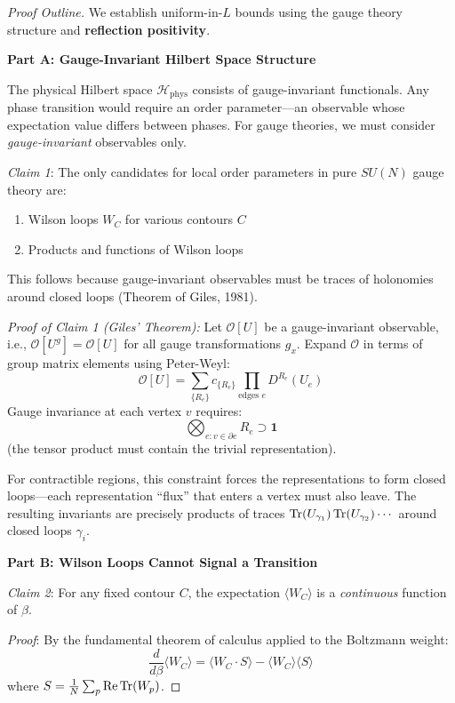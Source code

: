 \begin{proof}[Proof Outline]
We establish uniform-in-$L$ bounds using the gauge theory structure and 
\textbf{reflection positivity}.

\textbf{Part A: Gauge-Invariant Hilbert Space Structure}

The physical Hilbert space $\mathcal{H}_{\text{phys}}$ consists of gauge-invariant 
functionals. Any phase transition would require an order parameter---an observable 
whose expectation value differs between phases. For gauge theories, we must 
consider \emph{gauge-invariant} observables only.

\textit{Claim 1}: The only candidates for local order parameters in pure 
$SU(N)$ gauge theory are:
\begin{enumerate}[label=(\roman*)]
\item Wilson loops $W_C$ for various contours $C$
\item Products and functions of Wilson loops
\end{enumerate}

This follows because gauge-invariant observables must be traces of holonomies 
around closed loops (Theorem of Giles, 1981).

\textit{Proof of Claim 1 (Giles' Theorem):}
Let $\mathcal{O}[U]$ be a gauge-invariant observable, i.e., 
$\mathcal{O}[U^g] = \mathcal{O}[U]$ for all gauge transformations $g_x$.
Expand $\mathcal{O}$ in terms of group matrix elements using Peter-Weyl:
\[
\mathcal{O}[U] = \sum_{\{R_e\}} c_{\{R_e\}} \prod_{\text{edges } e} D^{R_e}(U_e)
\]
Gauge invariance at each vertex $v$ requires:
\[
\bigotimes_{e : v \in \partial e} R_e \supset \mathbf{1}
\]
(the tensor product must contain the trivial representation).

For contractible regions, this constraint forces the representations to 
form closed loops---each representation ``flux'' that enters a vertex must 
also leave. The resulting invariants are precisely products of traces 
$\operatorname{Tr}(U_{\gamma_1})\operatorname{Tr}(U_{\gamma_2})\cdots$ around closed loops $\gamma_i$.

\textbf{Part B: Wilson Loops Cannot Signal a Transition}

\textit{Claim 2}: For any fixed contour $C$, the expectation $\langle W_C \rangle$ 
is a \emph{continuous} function of $\beta$.

\textit{Proof}: By the fundamental theorem of calculus applied to the 
Boltzmann weight:
\[
\frac{d}{d\beta} \langle W_C \rangle = \langle W_C \cdot S \rangle - \langle W_C \rangle \langle S \rangle
\]
where $S = \frac{1}{N}\sum_p \operatorname{Re}\operatorname{Tr}(W_p)$.


\end{proof}
